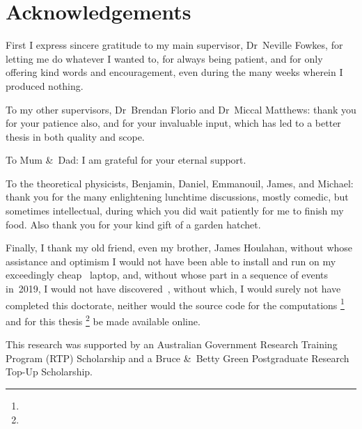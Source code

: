 \chapter{Acknowledgements}
\label{ch:acknowledgements}

\begin{loosecontent}

First I express sincere gratitude to my main supervisor,
Dr~Neville Fowkes,
for letting me do whatever I wanted to,
for always being patient,
and for only offering kind words and encouragement,
even during the many weeks wherein I produced nothing.

To my other supervisors,
Dr~Brendan Florio and Dr~Miccal Matthews:
thank you for your patience also,
and for your invaluable input,
which has led to a better thesis in both quality and scope.

To Mum \&~Dad:
I am grateful for your eternal support.

To the theoretical physicists,
Benjamin, Daniel, Emmanouil, James, and Michael:
thank you for the many enlightening lunchtime discussions,
mostly comedic, but sometimes intellectual,
during which you did wait patiently for me to finish my food.
Also thank you for your kind gift of a garden hatchet.

Finally, I thank my old friend, even my brother, James Houlahan,
without whose assistance and optimism
I would not have been able to install and run 
on my exceedingly cheap ~laptop,
and, without whose part in a sequence of events in~2019,
I would not have discovered~,
without which, I would surely not have completed this doctorate,
neither would the source code for the computations%
  \footnote{}
and for this thesis%
  \footnote{}
be made available online.

\end{loosecontent}

\thematicbreak

This research was supported
by an Australian Government Research Training Program (RTP) Scholarship
and a Bruce \&~Betty Green Postgraduate Research Top-Up Scholarship.
